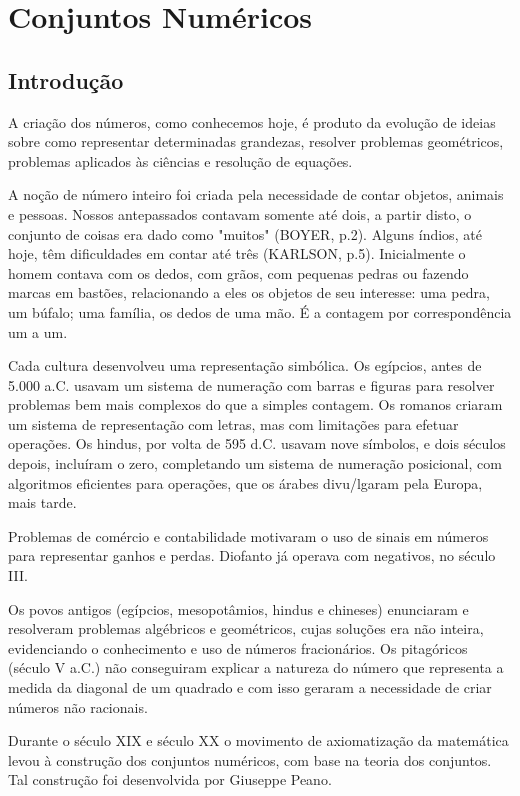 

\chapter{Conjuntos Numéricos}
\section{Introdução}

A criação dos números, como conhecemos hoje, é produto da evolução de ideias sobre como representar determinadas grandezas, resolver problemas geométricos, problemas aplicados às ciências e resolução de equações. 

A noção de número inteiro foi criada pela necessidade de contar objetos, animais e pessoas. Nossos antepassados contavam somente até dois, a partir disto, o conjunto de coisas era dado como "muitos" (BOYER, p.2). Alguns índios, até hoje, têm dificuldades em contar até três (KARLSON, p.5). Inicialmente o homem contava com os dedos, com grãos, com pequenas pedras ou fazendo marcas em bastões, relacionando a eles os objetos de seu interesse: uma pedra, um búfalo; uma família, os dedos de uma mão. É a contagem por correspondência um a um.

Cada cultura desenvolveu uma representação simbólica. Os egípcios, antes de 5.000 a.C. usavam um sistema de numeração com barras e figuras para resolver problemas bem mais complexos do que a simples contagem. Os romanos criaram um sistema de representação com letras, mas com limitações para efetuar operações. Os hindus, por volta de 595 d.C. usavam nove símbolos, e dois séculos depois, incluíram o zero, completando um sistema de numeração posicional, com algoritmos eficientes para operações, que os árabes divu/lgaram pela Europa, mais tarde. 

Problemas de comércio e contabilidade motivaram o uso de sinais em números para representar ganhos e perdas. Diofanto já operava com negativos, no século III. 

Os povos antigos (egípcios, mesopotâmios, hindus e chineses) enunciaram e resolveram problemas algébricos e geométricos, cujas soluções era não inteira, evidenciando o conhecimento e uso de números fracionários. Os pitagóricos (século V a.C.) não conseguiram explicar a natureza do número que representa a medida da diagonal de um quadrado e com isso geraram a necessidade de criar números não racionais. 

Durante o século XIX e século XX o movimento de axiomatização da matemática levou à construção dos conjuntos numéricos, com base na teoria dos conjuntos. Tal construção foi desenvolvida por Giuseppe Peano. 

